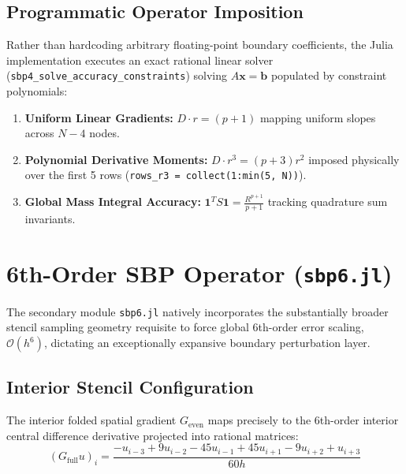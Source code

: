 \documentclass[reprint,amsmath,amssymb,aps]{revtex4-2}
\begin{document}
\subsection{Programmatic Operator Imposition}
Rather than hardcoding arbitrary floating-point boundary coefficients, the Julia implementation executes an exact rational linear solver (\texttt{sbp4\_solve\_accuracy\_constraints}) solving $A \mathbf{x} = \mathbf{b}$ populated by constraint polynomials:
\begin{enumerate}
    \item \textbf{Uniform Linear Gradients:} $D \cdot r = (p+1)$ mapping uniform slopes across $N-4$ nodes.
    \item \textbf{Polynomial Derivative Moments:} $D \cdot r^3 = (p+3)r^2$ imposed physically over the first 5 rows (\texttt{rows\_r3 = collect(1:min(5, N))}).
    \item \textbf{Global Mass Integral Accuracy:} $\mathbf{1}^T S \mathbf{1} = \frac{R^{p+1}}{p+1}$ tracking quadrature sum invariants.
\end{enumerate}


\section{6th-Order SBP Operator (\texttt{sbp6.jl})}

The secondary module \texttt{sbp6.jl} natively incorporates the substantially broader stencil sampling geometry requisite to force global 6th-order error scaling, $\mathcal{O}(h^6)$, dictating an exceptionally expansive boundary perturbation layer.

\subsection{Interior Stencil Configuration}
The interior folded spatial gradient $G_{\text{even}}$ maps precisely to the 6th-order interior central difference derivative projected into rational matrices:
\begin{equation}
    (G_{\text{full}} u)_i = \frac{ -u_{i-3} + 9u_{i-2} - 45u_{i-1} + 45u_{i+1} - 9u_{i+2} + u_{i+3} }{60h}
\end{equation}
\end{document}
